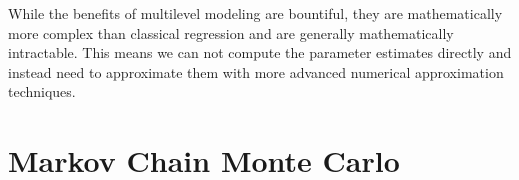 While the benefits of multilevel modeling are bountiful, they are mathematically more complex than classical regression and are generally mathematically intractable. This means we can not compute the parameter estimates directly and instead need to approximate them with more advanced numerical approximation techniques.

\section{Markov Chain Monte Carlo}

\begin{figure}
	 \\

\end{figure}
